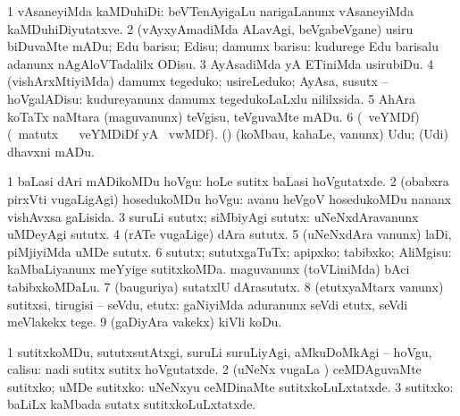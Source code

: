 \bentry
{}
\gl{\sakirx}
\bmng
\bnum
\num{1} vAsaneyiMda kaMDuhiDi:  beVTenAyigaLu narigaLanunx vAsaneyiMda kaMDuhiDiyutatxve. 
\num{2} (vAyxyAmadiMda ALavAgi, beVgabeVgane) usiru biDuvaMte mADu; Edu barisu; Edisu; damumx barisu:  kudurege Edu barisalu adanunx nAgAloVTadalilx ODisu. 
\num{3} AyAsadiMda yA ETiniMda usirubiDu. 
\num{4} (vishArxMtiyiMda) damumx tegeduko; usireLeduko; AyAsa, susutx -- hoVgalADisu:  kudureyanunx damumx tegedukoLaLxlu nililxsida. 
\num{5} AhAra koTaTx naMtara (maguvanunx) teVgisu, teVguvaMte mADu. 
\num{6} (\ucAcx\ veYMDf) (\BU\ matutx \BUkaq\  \ucAcx\ veYMDiDf yA  \ucAcx\ vwMDf). (\kAparx) (koMbau, kahaLe, \mo vanunx) Udu; (Udi) dhavxni mADu. 
\enum
\emng
\eentry

\bentry
{}
\gl{\sakirx}
\bmng
\bnum
\num{1} baLasi dAri mADikoMDu hoVgu:  hoLe sutitx baLasi hoVgutatxde. 
\num{2} (obabxra pirxVti \mo vugaLigAgi) hosedukoMDu hoVgu:  avanu heVgoV hosedukoMDu nananx vishAvxsa gaLisida. 
\num{3} suruLi sututx; siMbiyAgi sututx:  uNeNxdAravanunx uMDeyAgi sututx. 
\num{4} (rATe \mo vugaLige) dAra sututx. 
\num{5} (uNeNxdAra \mo vanunx) laDi, piMjiyiMda uMDe sututx. 
\num{6} sututx; sututxgaTuTx; apipxko; tabibxko; AliMgisu:  kaMbaLiyanunx meYyige sutitxkoMDa.  maguvanunx (toVLiniMda) bAci tabibxkoMDaLu. 
\num{7} (bauguriya) sutatxlU dArasututx. 
\num{8} (etutxyaMtarx \mo vanunx) sutitxsi, tirugisi -- seVdu, etutx:  gaNiyiMda aduranunx seVdi etutx, seVdi meVlakekx tege. 
\num{9} (gaDiyAra \mo vakekx) kiVli koDu. 
\enum
\emng

\noindent
\gl{\akirx}
\bmng
\bnum
\num{1} sutitxkoMDu, sututxsutAtxgi, suruLi suruLiyAgi, aMkuDoMkAgi -- hoVgu, calisu:  nadi sutitx sutitx hoVgutatxde. 
\num{2} (uNeNx \mo vugaLa \vi) ceMDAguvaMte sutitxko; uMDe sutitxko:  uNeNxyu ceMDinaMte sutitxkoLuLxtatxde. 
\num{3} sutitxko:  baLiLx kaMbada sutatx sutitxkoLuLxtatxde. 
\enum
\emng

